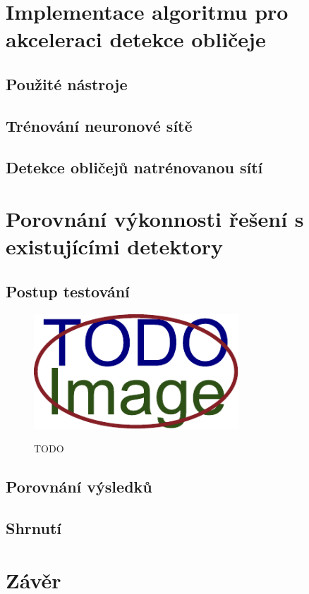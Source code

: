 
\chapter{Implementace algoritmu pro akceleraci detekce obličeje}
\label{kapitola:implementace}
\todo{\blindtext}

\section{Použité nástroje}
\todo{\blindtext}

\section{Trénování neuronové sítě}
\todo{\blindtext}

\section{Detekce obličejů natrénovanou sítí}
\todo{\blindtext}



\chapter{Porovnání výkonnosti řešení s existujícími detektory}
\label{kapitola:porovnani_vykonnosti}
\todo{\blindtext}

\section{Postup testování}
\todo{\blindtext}
\begin{figure}[h]\centering
  \centering
  \includegraphics[width=\linewidth,height=1.7in]{obrazky-figures/placeholder.pdf}\\[1pt]
  \label{TODO}
  \caption{TODO}
\end{figure}

\section{Porovnání výsledků}
\todo{\blindtext}

\section{Shrnutí}
\todo{\blindtext}

\chapter{Závěr}
\label{kapitola:zaver}
\todo{\Blindtext}